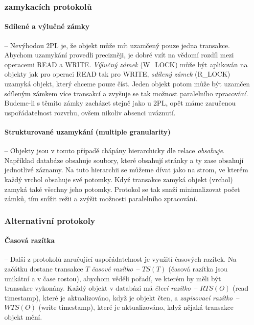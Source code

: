 \subsubsection*{ zamykacích protokolů}

\paragraph{Sdílené a výlučné zámky} -- Nevýhodou 2PL je, že objekt může mít
uzamčený pouze jedna transakce. Abychom uzamykání provedli precizněji, je dobré
vzít na vědomí rozdíl mezi operacemi READ a WRITE. \emph{Výlučný zámek}
(W\_LOCK) může být aplikován na objekty jak pro operaci READ tak pro WRITE,
\emph{sdílený zámek} (R\_LOCK) uzamyká objekt, který chceme pouze číst. Jeden
objekt potom může být uzamčen sdíleným zámkem více transakcí a zvyšuje se tak
možnost paralelního zpracování. Budeme-li s těmito zámky zacházet stejně jako u
2PL, opět máme zaručenou uspořádatelnost rozvrhu, ovšem nikoliv absenci uváznutí.


\paragraph{Strukturované uzamykání (multiple granularity)} -- Objekty jsou v
tomto případě chápány hierarchicky dle relace \emph{obsahuje}. Například
databáze obsahuje soubory, které obsahují stránky a ty zase obsahují jednotlivé
záznamy. Na tuto hierarchii se můžeme dívat jako na strom, ve kterém každý
vrchol obsahuje své potomky. Když transakce zamyká objekt (vrchol) zamyká také
všechny jeho potomky. Protokol se tak snaží minimalizovat počet zámků, tím
snížit režii a zvýšit možnosti paralelního zpracování.


\subsubsection*{Alternativní protokoly}

\paragraph{Časová razítka} -- Další z protokolů zaručující uspořádatelnost je
využití časových razítek. Na začátku dostane transakce $T$ \emph{časové
razítko}~-- $TS(T)$ (časová razítka jsou unikátní a v čase rostou), abychom věděli
pořadí, ve kterém by měli být transakce vykonány. Každý objekt v databázi má
\emph{čtecí razítko}~-- $RTS(O)$ (read timestamp), které je aktualizováno, když je
objekt čten, a \emph{zapisovací razítko}~-- $WTS(O)$ (write timestamp), které je
aktualizováno, když nějaká transakce objekt mění.

